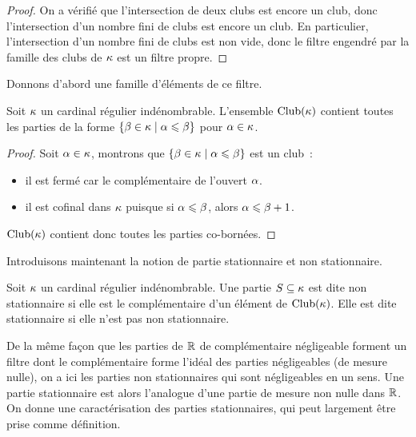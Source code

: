 \begin{proof}
  On a vérifié que l'intersection de deux clubs est encore un club, donc
  l'intersection d'un nombre fini de clubs est encore un club. En particulier,
  l'intersection d'un nombre fini de clubs est non vide, donc le filtre engendré
  par la famille des clubs de $\kappa$ est un filtre propre.
\end{proof}

\noindent
Donnons d'abord une famille d'éléments de ce filtre.

\begin{property}
  Soit $\kappa$ un cardinal régulier indénombrable. L'ensemble $\operatorname{Club}(\kappa)$
  contient toutes les parties de la forme
  $\left\{ \beta \in\kappa \;\middle\vert\; \alpha\leqslant\beta \right\}$ pour $\alpha \in \kappa$.
\end{property}

\begin{proof}
  Soit $\alpha \in \kappa$, montrons que
  $\left\{ \beta\in\kappa \;\middle\vert\; \alpha\leqslant\beta \right\}$ est un club~:
  \begin{itemize}
  \item il est fermé car le complémentaire de l'ouvert $\alpha$.
  \item il est cofinal dans $\kappa$ puisque si $\alpha \leqslant \beta$, alors
    $\alpha \leqslant \beta + 1$.
  \end{itemize}
  $\operatorname{Club}(\kappa)$ contient donc toutes les parties co-bornées.
\end{proof}

Introduisons maintenant la notion de partie stationnaire et non stationnaire.

\begin{definition}
  Soit $\kappa$ un cardinal régulier indénombrable. Une partie
  $S\subseteq\kappa$ est dite non stationnaire si elle est le
  complémentaire d'un élément de $\operatorname{Club}(\kappa)$. Elle est dite stationnaire si
  elle n'est pas non stationnaire.
\end{definition}

De la même façon que les parties de $\mathbb R$ de complémentaire négligeable forment
un filtre dont le complémentaire forme l'idéal des parties négligeables (de
mesure nulle), on a ici les parties non stationnaires qui sont négligeables en
un sens. Une partie stationnaire est alors l'analogue d'une partie de mesure non
nulle dans $\mathbb R$. On donne une caractérisation des parties stationnaires, qui
peut largement être prise comme définition.

